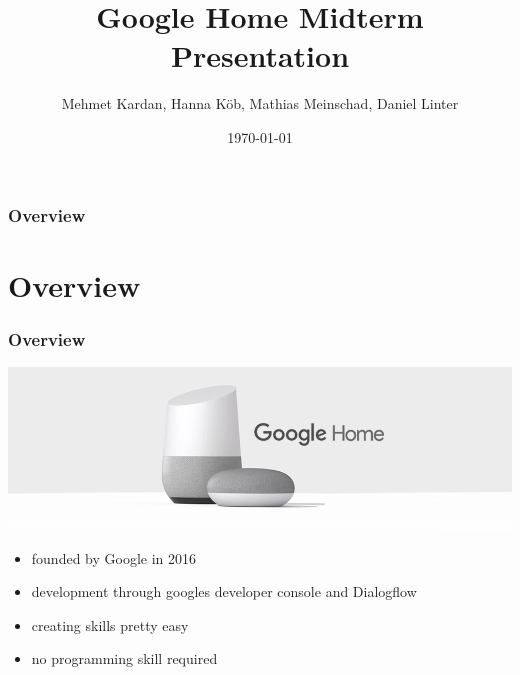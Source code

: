\documentclass{beamer}
\title[Google Home]{Google Home Midterm Presentation} %
\author{Mehmet Kardan, Hanna Köb, Mathias Meinschad, Daniel Linter} %
\institute[UCLA] %
{
University of Innsbruck - SIT \\ %
}
\date{\today} %
\begin{document}
\begin{frame}
\titlepage %
\end{frame}

\begin{frame}
\frametitle{Overview} %
\tableofcontents %
\end{frame}


\section{Overview}

\begin{frame}
\frametitle{Overview}
\begin{center}
\includegraphics[scale=0.35]{pictures/google-home.png} 
\end{center}
\begin{itemize}
\item founded by Google in 2016
\item development through googles developer console and Dialogflow
\item creating skills pretty easy
\item no programming skill required
\end{itemize}
\end{frame}
\end{document}
